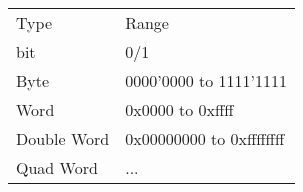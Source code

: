 \documentclass[en, 11pt, xcolor=dvipsnames]{beamer}
\begin{document}
\begin{frame}[fragile]
\begin{columns}[c]
\begin{column}{0.9\textwidth}
			\begin{table}
				\begin{tabular}{l l}
					Type        & Range                    \\
					bit         & 0/1                      \\
					Byte        & 0000'0000 to 1111'1111   \\
					Word        & 0x0000 to 0xffff         \\
					Double Word & 0x00000000 to 0xffffffff \\
					Quad Word   & ...                      \\
				\end{tabular}
			\end{table}

		\end{column}
	\end{columns}

\end{frame}
\end{document}
